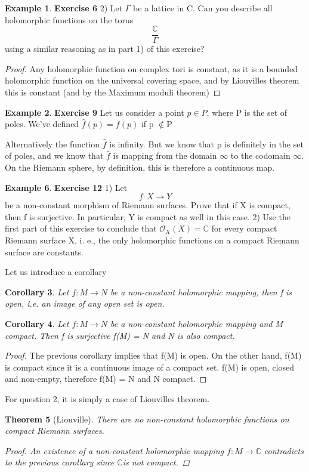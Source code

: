 \documentclass[12pt, oneside, a4paper]{article}
\newtheorem{thm}{Theorem}[section]
\newtheorem{cor}[thm]{Corollary}
\theoremstyle{definition}
\newtheorem{ex}[thm]{Example}
\def\Cbb{\ensuremath{\mathbb{C}}}
\begin{document}
\begin{ex}\textbf{Exercise 6}
2) Let $\Gamma$ be a lattice in C. Can you describe all holomorphic functions on the torus $$\frac{\Cbb}{\Gamma}$$ using
a similar reasoning as in part 1) of this exercise?
\begin{proof}
Any holomorphic function on complex tori is constant, as it is a bounded holomorphic function on the 
universal covering space, and by Liouvilles theorem this is constant (and by the Maximum moduli theorem)
\end{proof}
\end{ex}
\begin{ex}
 \textbf{Exercise 9}
Let us consider a point $p\in P$, where P is the set of poles. 
We've defined
$\hat{f}(p) = f(p)$ if p $\notin$P 


Alternatively the function $\hat{f}$ is infinity. 
But we know that p is definitely in the set of poles, and we know that $\hat{f}$ is mapping from the domain $\infty$
to the codomain $\infty$. On the Riemann sphere, by definition, this is therefore a continuous map. 

\end{ex}
\begin{ex}\textbf{Exercise 12}
1) Let $$f : X \rightarrow Y$$ be a non-constant morphism of Riemann surfaces. Prove
that if X is compact, then f is surjective. In particular, Y is compact as well in this case.
2) Use the first part of this exercise to conclude that $\mathcal{O}_X(X) = \mathbb{C}$ for every compact Riemann
surface X, i. e., the only holomorphic functions on a compact Riemann surface are constants.

Let us introduce a corollary
\begin{cor} Let $f : M \rightarrow N$ be a non-constant holomorphic mapping, then f is open,
i.e. an image of any open set is open.
\end{cor}
\begin{cor} Let $f : M \rightarrow N$ be a non-constant holomorphic mapping and M compact.
Then f is surjective f(M) = N and N is also compact.
\end{cor}
\begin{proof} The previous corollary implies that f(M) is open. On the other hand, f(M)
is compact since it is a continuous image of a compact set. f(M) is open, closed and
non-empty, therefore f(M) = N and N compact.
\end{proof}
For question 2, it is simply a case of Liouvilles theorem. 
\begin{thm}[Liouville]
There are no non-constant holomorphic functions on compact Riemann surfaces.
\begin{proof} An existence of a non-constant holomorphic mapping $f : M \rightarrow \mathbb{C}$ contradicts to
the previous corollary since \Cbb is not compact.
\end{proof}
\end{thm}

\end{ex}
\end{document}

